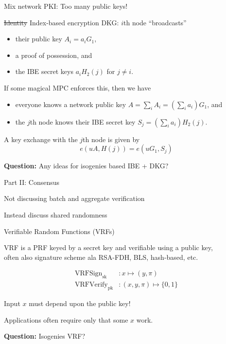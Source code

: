 \documentclass[fleqn,xcolor={usenames,dvipsnames},notes,aspectratio=169]{beamer} %
\begin{document}
\begin{frame}{Mix network PKI: Too many public keys!}

\sout{Identity} Index-based encryption DKG:
$i$th node ``broadcasts''
\begin{itemize}
\item their public key $A_i = a_i G_1$, 
\item a proof of possession, and
\item the IBE secret keys $a_i H_2(j)$ for $j \neq i$.
\end{itemize}
If some magical MPC enforces this, then we have
\begin{itemize}
\item everyone knows a network public key $A = \sum_i A_i = (\sum_i a_i) G_1$, and
\item the $j$th node knows their IBE secret key $S_j = (\sum_i a_i) H_2(j)$.
\end{itemize}
A key exchange with the $j$th node is given by
$$ e(u A,H(j)) = e(u G_1,S_j) $$

\medskip

{\bf Question:}  Any ideas for isogenies based IBE + DKG?

\end{frame}


\begin{frame}{Part II:  Consensus}

Not discussing batch and aggregate verification

\bigskip
\hspace{20pt}Instead discuss shared randomness

\end{frame}


\begin{frame}[t]{Verifiable Random Functions (VRFs)}

VRF is a PRF keyed by a secret key and verifiable using a public key, \\
often also signature scheme ala RSA-FDH, BLS, hash-based, etc.

\begin{align*}
\mathrm{VRFSign}_{\mathrm{sk}} &: x \mapsto (y,\pi) \\
\mathrm{VRFVerify}_{\mathrm{pk}} &: (x,y,\pi) \mapsto \{0,1\} 
\end{align*}

\medskip

Input $x$ must depend upon the public key!

\medskip

Applications often require only that some $x$ work.

\bigskip
\bigskip

{\bf Question:}  Isogenies VRF?

\end{frame}
\end{document}
